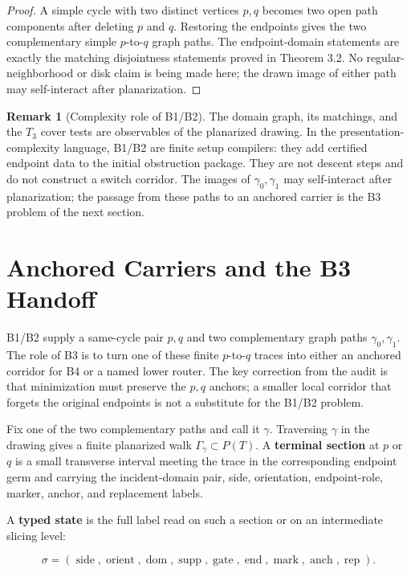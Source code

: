 \documentclass[11pt]{amsart}
\theoremstyle{definition}
\newtheorem{remark}[theorem]{Remark}
\begin{document}
\begin{proof}
A simple cycle with two distinct vertices \(p,q\) becomes two open
path components after deleting \(p\) and \(q\). Restoring the endpoints gives the
two complementary simple \(p\)-to-\(q\) graph paths. The endpoint-domain statements
are exactly the matching disjointness statements proved in Theorem 3.2. No
regular-neighborhood or disk claim is being made here; the drawn image of either
path may self-interact after planarization.

\end{proof}
\begin{remark}[Complexity role of B1/B2]
The domain graph, its matchings, and the \(T_3\) cover tests are observables of the planarized drawing. In the presentation-complexity language, B1/B2 are finite setup compilers: they add certified endpoint data to the initial obstruction package. They are not descent steps and do not construct a switch corridor. The images of \(\gamma_0,\gamma_1\) may self-interact after planarization; the passage from these paths to an anchored carrier is the B3 problem of the next section.


\end{remark}
\section{Anchored Carriers and the B3 Handoff}

B1/B2 supply a same-cycle pair \(p,q\) and two complementary graph paths \(\gamma_0,\gamma_1\). The role of B3 is to turn one of these finite \(p\)-to-\(q\) traces into either an anchored corridor for B4 or a named lower router. The key correction from the audit is that minimization must preserve the \(p,q\) anchors; a smaller local corridor that forgets the original endpoints is not a substitute for the B1/B2 problem.

Fix one of the two complementary paths and call it \(\gamma\). Traversing \(\gamma\) in the drawing gives a finite planarized walk \(\Gamma_\gamma\subset P(T)\). A \textbf{terminal section} at \(p\) or \(q\) is a small transverse interval meeting the trace in the corresponding endpoint germ and carrying the incident-domain pair, side, orientation, endpoint-role, marker, anchor, and replacement labels.

A \textbf{typed state} is the full label read on such a section or on an intermediate slicing level:

\[
\sigma=(\operatorname{side},\operatorname{orient},\operatorname{dom},
\operatorname{supp},\operatorname{gate},\operatorname{end},
\operatorname{mark},\operatorname{anch},\operatorname{rep}).
\]
\end{document}
